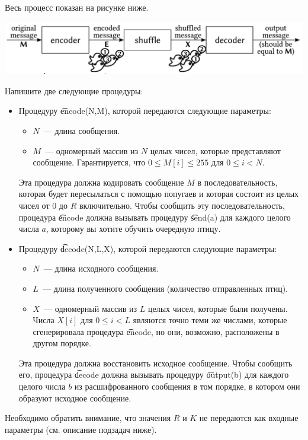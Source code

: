 Весь процесс показан на рисунке ниже.

\includegraphics[width=175mm]{parrots1.png}

Напишите две следующие процедуры:
\begin{itemize}
\item Процедуру \t{encode(N,M)}, которой передаются следующие параметры:
\begin{itemize}
\item $N$~--- длина сообщения.
\item $M$~--- одномерный массив из $N$ целых чисел, которые представляют сообщение.
Гарантируется, что $0 \leq M[i] \leq 255$ для $0 \leq i < N$.
\end{itemize}
Эта процедура должна кодировать сообщение $M$ в последовательность, которая будет
пересылаться с помощью попугаев и которая состоит из целых чисел от $0$ до $R$
включительно. Чтобы сообщить эту последовательность, процедура \t{encode} должна
вызывать процедуру \t{send(a)} для каждого целого числа $a$, которому вы хотите обучить
очередную птицу.
\item Процедуру \t{decode(N,L,X)}, которой передаются следующие параметры:
\begin{itemize}
\item $N$~--- длина исходного сообщения.
\item $L$~--- длина полученного сообщения (количество отправленных птиц).
\item $X$~--- одномерный массив из $L$ целых чисел, которые были получены. Числа
$X[i]$ для $0 \leq i < L$ являются точно теми же числами, которые сгенерировала
процедура \t{encode}, но они, возможно, расположены в другом порядке. 
\end{itemize}
Эта процедура должна восстановить исходное сообщение. Чтобы сообщить его,
процедура \t{decode} должна вызывать процедуру \t{output(b)} для каждого целого числа $b$
из расшифрованного сообщения в том порядке, в котором они образуют исходное
сообщение.
\end{itemize}
Необходимо обратить внимание, что значения $R$ и $K$ не передаются как входные параметры
(см. описание подзадач ниже).

